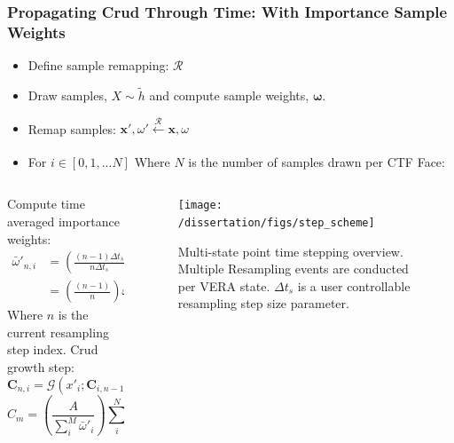 \documentclass[t, pdftex]{beamer}
\begin{document}
\begin{frame}[shrink=20]
\frametitle{\small Propagating Crud Through Time: With Importance Sample Weights}
\vspace{-20pt}
\begin{itemize}
    \item Define sample remapping:  $ \mathcal R $  
    \item Draw samples, $X \sim \tilde h$ and compute sample weights, $\mathbf \omega$.
    \item Remap samples:  $\mathbf x', \omega' \xleftarrow[\text{ }]{\mathcal R} \mathbf x, \omega $
    \item For $ i \in [0, 1, ... N]$  Where $N$ is the number of samples drawn per CTF Face:
\end{itemize}
\begin{columns}
    \begin{column}{0.5\textwidth}
Compute time averaged importance weights:
\begin{align}
\bar \omega'_{{n},i} &= \left( \frac{(n-1) \Delta t_s}{n \Delta t_s} \right) \bar \omega'_{n-1,i} + \left( \frac{\Delta t_s}{n \Delta t_s} \right) \omega'_{n,i} \nonumber \\
&= \left( \frac{(n-1)}{n} \right) \bar \omega'_{n-1,i} + \left( \frac{1}{n} \right) \omega'_{n,i} \nonumber
\label{eq:time_sample_weights3}
\end{align}
Where $n$ is the current resampling step index.
Crud growth step:
\[
\mathbf C_{n,i} = \mathcal G(x'_i; \mathbf C_{i, n-1}, \mathbf I, \Delta t_s)
\]
\begin{equation}
C_{m} = \left(\frac{A}{\sum_i^M \bar \omega'_i}\right) \sum_i^N C'_i \bar \omega'_i \nonumber
\label{eq:patch_sum_mass}
\end{equation}
   \end{column}
\begin{column}{0.5\textwidth}
\begin{figure}[H]
    \centering
    \texttt{[image: /dissertation/figs/step\_scheme]}
    \caption{Multi-state point time stepping overview.  Multiple Resampling events are conducted per VERA state.  $\Delta t_s$ is a user controllable resampling step size parameter.}
    \label{fig:stepscheme}
\end{figure}
 \end{column}
\end{columns}
\end{frame}
\end{document}
